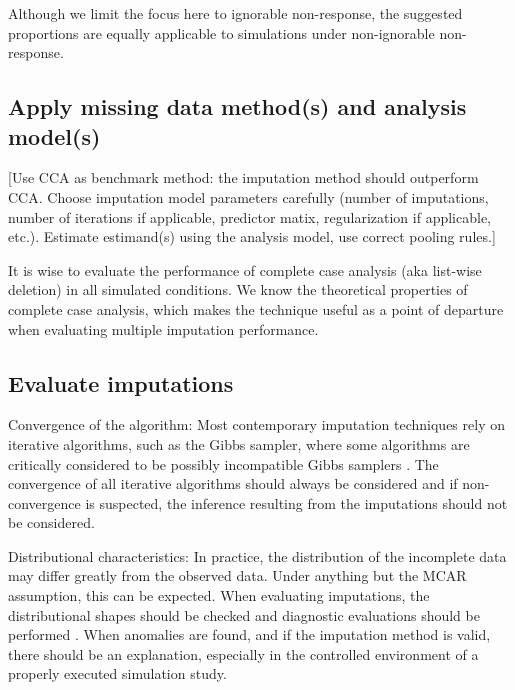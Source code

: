 \documentclass[bimj,fleqn]{w-art}
\theoremstyle{plain}
\theoremstyle{definition}
\begin{document}
Although we limit the focus here to ignorable non-response, the suggested proportions are equally applicable to simulations under non-ignorable non-response.
 


\subsection{Apply missing data method(s) and analysis model(s)}


[Use CCA as benchmark method: the imputation method should outperform CCA. Choose imputation model parameters carefully (number of imputations, number of iterations if applicable, predictor matix, regularization if applicable, etc.). Estimate estimand(s) using the analysis model, use correct pooling rules.]

It is wise to evaluate the performance of complete case analysis (aka list-wise deletion) in all simulated conditions. We know the theoretical properties of complete case analysis, which makes the technique useful as a point of departure when evaluating multiple imputation performance. 


\subsection{Evaluate imputations}


Convergence of the algorithm: Most contemporary imputation techniques rely on iterative algorithms, such as the Gibbs sampler, where some algorithms are critically considered to be possibly incompatible Gibbs samplers \citep[PIGS,][]{li2012imputing}. The convergence of all iterative algorithms should always be considered and if non-convergence is suspected, the inference resulting from the imputations should not be considered. 

Distributional characteristics: In practice, the distribution of the incomplete data may differ greatly from the observed data. Under anything but the MCAR assumption, this can be expected. When evaluating imputations, the distributional shapes should be checked and diagnostic evaluations should be performed \citep[see][for an detailed overview of diagnostic evaluation for multivariate imputations]{abayomi2008diagnostics}. When anomalies are found, and if the imputation method is valid, there should be an explanation, especially in the controlled environment of a properly executed simulation study. 
\end{document}
